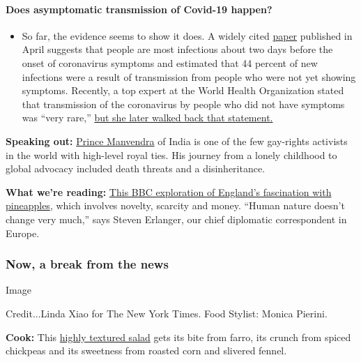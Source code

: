 \begin{itemize}
{  \paragraph{Does asymptomatic transmission of Covid-19
  happen?}\label{does-asymptomatic-transmission-of-covid-19-happen}}

  \begin{itemize}
  \tightlist
  \item
    So far, the evidence seems to show it does. A widely cited
    \href{https://www.nature.com/articles/s41591-020-0869-5}{paper}
    published in April suggests that people are most infectious about
    two days before the onset of coronavirus symptoms and estimated that
    44 percent of new infections were a result of transmission from
    people who were not yet showing symptoms. Recently, a top expert at
    the World Health Organization stated that transmission of the
    coronavirus by people who did not have symptoms was ``very rare,''
    \href{https://www.nytimes3xbfgragh.onion/2020/06/09/world/coronavirus-updates.html?action=click\&pgtype=Article\&state=default\&region=MAIN_CONTENT_3\&context=storylines_faq\#link-1f302e21}{but
    she later walked back that statement.}
  \end{itemize}
\end{itemize}

\textbf{Speaking out:}
\href{https://www.nytimes3xbfgragh.onion/2020/07/31/world/asia/india-prince-manvendra-gay-rights.html}{Prince
Manvendra} of India is one of the few gay-rights activists in the world
with high-level royal ties. His journey from a lonely childhood to
global advocacy included death threats and a disinheritance.

\textbf{What we're reading:}
\href{https://www.bbc.com/news/uk-england-53432877}{This BBC exploration
of England's fascination with pineapples}, which involves novelty,
scarcity and money. ``Human nature doesn't change very much,'' says
Steven Erlanger, our chief diplomatic correspondent in Europe.

\hypertarget{now-a-break-from-the-news}{%
\subsubsection{Now, a break from the
news}\label{now-a-break-from-the-news}}

Image

Credit...Linda Xiao for The New York Times. Food Stylist: Monica
Pierini.

\textbf{Cook:} This
\href{https://www.nytimes3xbfgragh.onion/2020/07/31/dining/farro-corn-chickpea-salad-recipe.html}{highly
textured salad} gets its bite from farro, its crunch from spiced
chickpeas and its sweetness from roasted corn and slivered fennel.

